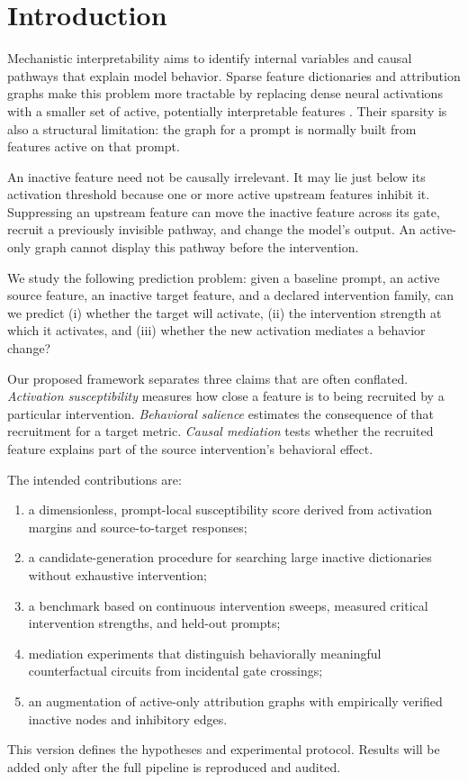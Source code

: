 \section{Introduction}
\label{sec:introduction}

Mechanistic interpretability aims to identify internal variables and causal pathways that explain model behavior. Sparse feature dictionaries and attribution graphs make this problem more tractable by replacing dense neural activations with a smaller set of active, potentially interpretable features \citep{ameisen2025circuit,lindsey2025biology}. Their sparsity is also a structural limitation: the graph for a prompt is normally built from features active on that prompt.

An inactive feature need not be causally irrelevant. It may lie just below its activation threshold because one or more active upstream features inhibit it. Suppressing an upstream feature can move the inactive feature across its gate, recruit a previously invisible pathway, and change the model's output. An active-only graph cannot display this pathway before the intervention.

We study the following prediction problem: given a baseline prompt, an active source feature, an inactive target feature, and a declared intervention family, can we predict (i) whether the target will activate, (ii) the intervention strength at which it activates, and (iii) whether the new activation mediates a behavior change?

Our proposed framework separates three claims that are often conflated. \emph{Activation susceptibility} measures how close a feature is to being recruited by a particular intervention. \emph{Behavioral salience} estimates the consequence of that recruitment for a target metric. \emph{Causal mediation} tests whether the recruited feature explains part of the source intervention's behavioral effect.

The intended contributions are:
\begin{enumerate}
    \item a dimensionless, prompt-local susceptibility score derived from activation margins and source-to-target responses;
    \item a candidate-generation procedure for searching large inactive dictionaries without exhaustive intervention;
    \item a benchmark based on continuous intervention sweeps, measured critical intervention strengths, and held-out prompts;
    \item mediation experiments that distinguish behaviorally meaningful counterfactual circuits from incidental gate crossings;
    \item an augmentation of active-only attribution graphs with empirically verified inactive nodes and inhibitory edges.
\end{enumerate}

This version defines the hypotheses and experimental protocol. Results will be added only after the full pipeline is reproduced and audited.
